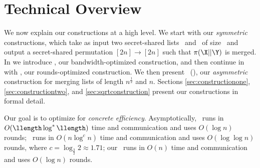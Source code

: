 \section{Technical Overview}\label{sec:overview}

We now explain our constructions at a high level. We start with our \emph{symmetric} constructions, which take as input two secret-shared lists \X\ and \Y\ of size \llength\ and output  
a secret-shared permutation $[2n]\rightarrow[2n]$ such that $\pi(\X||\Y)$ is merged. In  we introduce \ourapproach, our bandwidth-optimized construction, and then continue in  with \ourapproachtwo, our rounds-optimized construction. We then present \sqrtmerge\ (), our \emph{asymmetric} construction for merging lists of length $n^{\frac{1}{2}}$ and $n$. 
Sections \ref{sec:constructionone}, \ref{sec:constructiontwo}, and \ref{sec:sqrtconstruction} present our constructions in formal detail. %

Our goal is to optimize for \emph{concrete efficiency}.
Asymptotically, \ourapproach\ runs in $O(\llength\log^{*}\llength)$ %
time and communication and uses $O(\log n)$ rounds; \ourapproachtwo\ runs in $O(n\log^c n)$ time and communication and uses $O(\log\log n)$ rounds, where $c = \log_{\frac{3}{2}}2 \approx 1.71$; our \sqrtmerge\ runs in $O(n)$ time and communication and uses $O(\log n)$ rounds.


